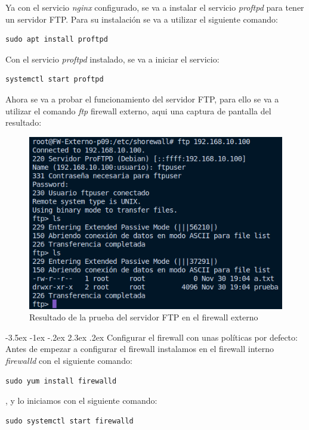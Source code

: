 \documentclass[11pt]{report}
\makeatletter
\renewcommand\chapter{\@startsection{chapter}{0}{\z@}%
    {-3.5ex \@plus -1ex \@minus -.2ex}%
    {2.3ex \@plus.2ex}%
    {\normalfont\Large\bfseries}}
\makeatother
\begin{document}
Ya con el servicio \emph{nginx} configurado, se va a instalar el servicio \emph{proftpd} para tener un servidor FTP. Para su instalación
se va a utilizar el siguiente comando:
\begin{BVerbatim}
sudo apt install proftpd
\end{BVerbatim}

Con el servicio \emph{proftpd} instalado, se va a iniciar el servicio:
\begin{BVerbatim}
systemctl start proftpd
\end{BVerbatim}

Ahora se va a probar el funcionamiento del servidor FTP, para ello se va a utilizar el comando \emph{ftp} firewall externo, aqui una
captura de pantalla del resultado:
\begin{figure}[H]
  \centering
  \includegraphics[scale=0.55]{img/ftp.png}
  \caption{Resultado de la prueba del servidor FTP en el firewall externo}
  \label{fig:Resultado de la prueba del servidor FTP en el firewall externo}
\end{figure}

\cleardoublepage

\chapter{Configurar el firewall con unas políticas por defecto: }
Antes de empezar a configurar el firewall instalamos en el firewall interno \emph{firewalld} con el siguiente comando:
\begin{BVerbatim}
sudo yum install firewalld
\end{BVerbatim}
, y lo iniciamos con el siguiente comando: \\
\begin{BVerbatim}
sudo systemctl start firewalld
\end{BVerbatim}
\end{document}
